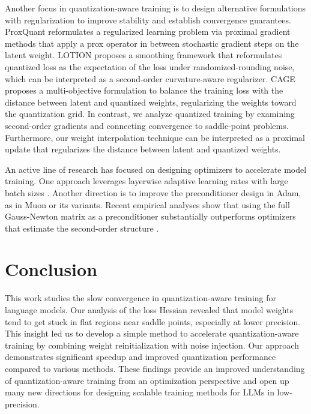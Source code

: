 \documentclass{article}
\theoremstyle{definition}
\begin{document}
Another focus in quantization-aware training is to design alternative formulations with regularization to improve stability and establish convergence guarantees. ProxQuant \citep{bai2018proxquant} reformulates a regularized learning problem via proximal gradient methods that apply a prox operator in between stochastic gradient steps on the latent weight. 
LOTION \citep{kwun2025lotion} proposes a smoothing framework that reformulates quantized loss as the expectation of the loss under randomized-rounding noise, which can be interpreted as a second-order curvature-aware regularizer.  
CAGE \citep{tabesh2025cage} proposes a multi-objective formulation to balance the training loss with the distance between latent and quantized weights, regularizing the weights toward the quantization grid. In contrast, we analyze quantized training by examining second-order gradients and connecting convergence to saddle-point problems. Furthermore, our weight interpolation technique can be interpreted as a proximal update that regularizes the distance between latent and quantized weights.



An active line of research has focused on designing optimizers to accelerate model training. 
One approach leverages layerwise adaptive learning rates with large batch sizes \citep{you2020large}. Another direction is to improve the preconditioner design in Adam, as in Muon or its variants. %
Recent empirical analyses show that using the full Gauss-Newton matrix as a preconditioner substantially outperforms optimizers that estimate the second-order structure \cite{abreu2025potential}. %

\section{Conclusion}

This work studies the slow convergence in quantization-aware training for language models. Our analysis of the loss Hessian revealed that model weights tend to get stuck in flat regions near saddle points, especially at lower precision. This insight led us to develop a simple method to accelerate quantization-aware training by combining weight reinitialization with noise injection. Our approach demonstrates significant speedup and improved quantization performance compared to various methods. These findings provide an improved understanding of quantization-aware training from an optimization perspective and open up many new directions for designing scalable training methods for LLMs in low-precision.
\end{document}
